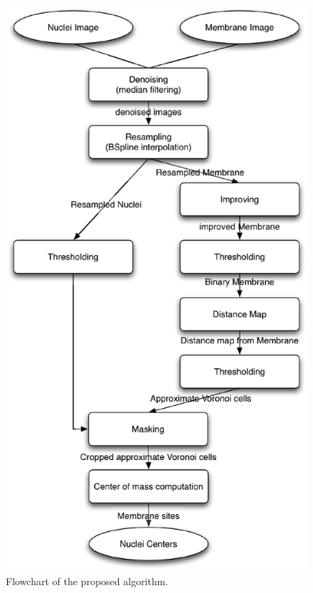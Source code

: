 \begin{figure}[h]
\begin{center}
\leavevmode
\includegraphics[height=0.87\textheight]{pictures/proposalFlowchart}
\end{center}
\caption{Flowchart of the proposed algorithm.}
\label{fig:propFlowchart}
\end{figure}

